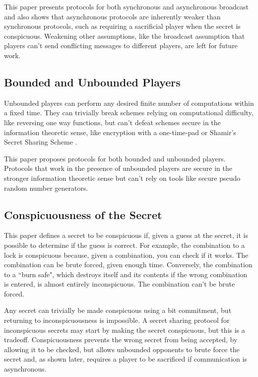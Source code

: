 \documentclass{dalcsthesis}
\begin{document}
This paper presents protocols for both synchronous and asynchronous broadcast and also shows that asynchronous protocols are inherently weaker than synchronous protocols, such as requiring a sacrificial player when the secret is conspicuous. Weakening other assumptions, like the broadcast assumption that players can't send conflicting messages to different players, are left for future work.

\subsection{Bounded and Unbounded Players}

Unbounded players can perform any desired finite number of computations within a fixed time. They can trivially break schemes relying on computational difficulty, like reversing one way functions, but can't defeat schemes secure in the information theoretic sense, like encryption with a one-time-pad or Shamir's Secret Sharing Scheme \cite{shamir79}.

This paper proposes protocols for both bounded and unbounded players. Protocols that work in the presence of unbounded players are secure in the stronger information theoretic sense but can't rely on tools like secure pseudo random number generators.

\subsection{Conspicuousness of the Secret} 

This paper defines a secret to be conspicuous if, given a guess at the secret, it is possible to determine if the guess is correct. For example, the combination to a lock is conspicuous because, given a combination, you can check if it works. The combination can be brute forced, given enough time. Conversely, the combination to a ``burn safe", which destroys itself and its contents if the wrong combination is entered, is almost entirely inconspicuous. The combination can't be brute forced.

Any secret can trivially be made conspicuous using a bit commitment, but returning to inconspicuousness is impossible. A secret sharing protocol for inconspicuous secrets may start by making the secret conspicuous, but this is a tradeoff. Conspicuousness prevents the wrong secret from being accepted, by allowing it to be checked, but allows unbounded opponents to brute force the secret and, as shown later, requires a player to be sacrificed if communication is asynchronous.
\end{document}
